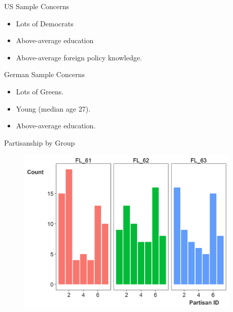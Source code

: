 \documentclass[12pt]{beamer}
\begin{document}

\begin{frame}{US Sample Concerns}

\begin{itemize}
\item Lots of Democrats
\item Above-average education
\item Above-average foreign policy knowledge. 
\end{itemize} 

\end{frame}



\begin{frame}{German Sample Concerns}

\begin{itemize}
\item Lots of Greens.
\item Young (median age 27). 
\item Above-average education. 
\end{itemize} 

\end{frame}





\begin{frame}{Partisanship by Group}

\begin{figure}[htbp]
	\centering
		\includegraphics[width=0.95\textwidth]{partisan-group.png}
\end{figure}


\end{frame}
\end{document}
